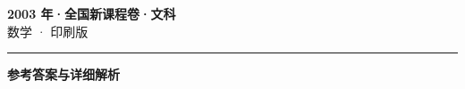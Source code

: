 \documentclass[zihao=5, a4paper]{ctexart}
\begin{document}
\begin{center}
  {\Large\bfseries 2003 年·全国新课程卷·文科}\\[4pt]
  {\large 数学 · 印刷版}
\end{center}
\medskip
{}

\par\bigskip\hrule\bigskip
{}
\begin{center}{\large\bfseries 参考答案与详细解析}\end{center}
\smallskip

\end{document}
